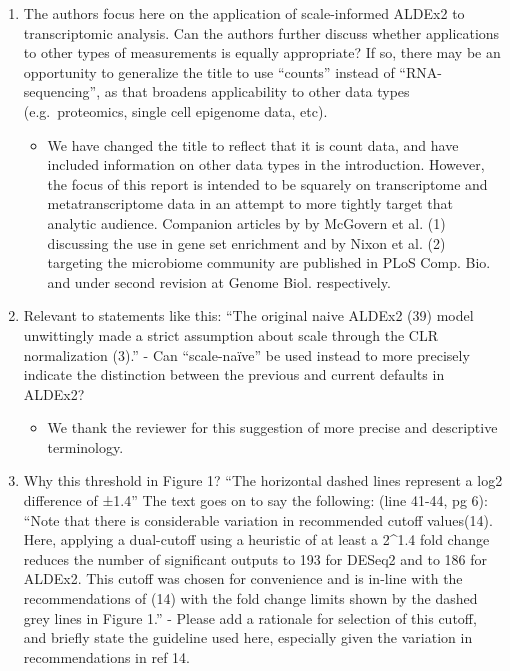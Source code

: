 \documentclass[
]{article}
\providecommand{\tightlist}{%
  \setlength{\itemsep}{0pt}\setlength{\parskip}{0pt}}
\begin{document}
\begin{enumerate}
\def\labelenumi{\arabic{enumi}.}
\item
  The authors focus here on the application of scale-informed ALDEx2 to
  transcriptomic analysis. Can the authors further discuss whether
  applications to other types of measurements is equally appropriate? If
  so, there may be an opportunity to generalize the title to use
  ``counts'' instead of ``RNA-sequencing'', as that broadens
  applicability to other data types (e.g.~proteomics, single cell
  epigenome data, etc).

  \begin{itemize}
  \tightlist
  \item
    We have changed the title to reflect that it is count data, and have
    included information on other data types in the introduction.
    However, the focus of this report is intended to be squarely on
    transcriptome and metatranscriptome data in an attempt to more
    tightly target that analytic audience. Companion articles by by
    McGovern et al. (1) discussing the use in gene set enrichment and by
    Nixon et al. (2) targeting the microbiome community are published in
    PLoS Comp. Bio. and under second revision at Genome Biol.
    respectively.
  \end{itemize}
\item
  Relevant to statements like this: ``The original naive ALDEx2 (39)
  model unwittingly made a strict assumption about scale through the CLR
  normalization (3).'' - Can ``scale-naïve'' be used instead to more
  precisely indicate the distinction between the previous and current
  defaults in ALDEx2?

  \begin{itemize}
  \tightlist
  \item
    We thank the reviewer for this suggestion of more precise and
    descriptive terminology.
  \end{itemize}
\item
  Why this threshold in Figure 1? ``The horizontal dashed lines
  represent a log2 difference of ±1.4'' The text goes on to say the
  following: (line 41-44, pg 6): ``Note that there is considerable
  variation in recommended cutoff values(14). Here, applying a
  dual-cutoff using a heuristic of at least a 2\^{}1.4 fold change
  reduces the number of significant outputs to 193 for DESeq2 and to 186
  for ALDEx2. This cutoff was chosen for convenience and is in-line with
  the recommendations of (14) with the fold change limits shown by the
  dashed grey lines in Figure 1.'' - Please add a rationale for
  selection of this cutoff, and briefly state the guideline used here,
  especially given the variation in recommendations in ref 14.


\end{enumerate}
\end{document}
